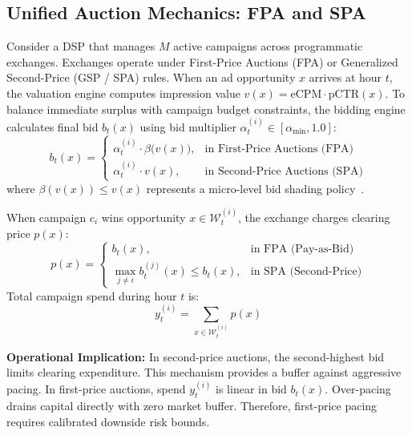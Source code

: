 \documentclass[sigconf]{acmart}
\begin{document}
\subsection{Unified Auction Mechanics: FPA and SPA}
Consider a DSP that manages $M$ active campaigns across programmatic exchanges. Exchanges operate under First-Price Auctions (FPA) or Generalized Second-Price (GSP / SPA) rules. When an ad opportunity $x$ arrives at hour $t$, the valuation engine computes impression value $v(x) = \text{eCPM} \cdot \text{pCTR}(x)$. To balance immediate surplus with campaign budget constraints, the bidding engine calculates final bid $b_t(x)$ using bid multiplier $\alpha_t^{(i)} \in [\alpha_{\min}, 1.0]$:
\begin{equation}
    b_t(x) = \begin{cases}
        \alpha_t^{(i)} \cdot \beta\big(v(x)\big), & \text{in First-Price Auctions (FPA)} \\
        \alpha_t^{(i)} \cdot v(x), & \text{in Second-Price Auctions (SPA)}
    \end{cases}
    \label{eq:bidding_mechanisms}
\end{equation}
where $\beta(v(x)) \le v(x)$ represents a micro-level bid shading policy~\cite{zhou2021bid,balseiro2021budget}. 

When campaign $c_i$ wins opportunity $x \in \mathcal{W}_t^{(i)}$, the exchange charges clearing price $p(x)$:
\begin{equation}
    p(x) = \begin{cases}
        b_t(x), & \text{in FPA (Pay-as-Bid)} \\
        \max_{j \ne i} b_t^{(j)}(x) \le b_t(x), & \text{in SPA (Second-Price)}
    \end{cases}
\end{equation}
Total campaign spend during hour $t$ is:
\begin{equation}
    y_t^{(i)} = \sum_{x \in \mathcal{W}_t^{(i)}} p(x)
\end{equation}

\textbf{Operational Implication:} In second-price auctions, the second-highest bid limits clearing expenditure. This mechanism provides a buffer against aggressive pacing. In first-price auctions, spend $y_t^{(i)}$ is linear in bid $b_t(x)$. Over-pacing drains capital directly with zero market buffer. Therefore, first-price pacing requires calibrated downside risk bounds.
\end{document}
